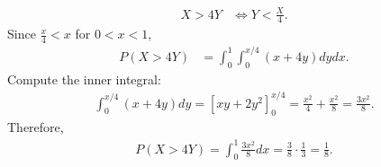 \documentclass[12pt]{article} %
\newcommand{\Red}{\color{Red}}
\begin{document}
\begin{enumerate}
        {\Red
        \begin{align*}
        X>4Y 
        &\iff Y<\frac{X}{4}.
        \end{align*}
        Since $\frac{x}{4}<x$ for $0<x<1$,
        \begin{align*}
        P(X>4Y)
        &=\int_{0}^{1}\int_{0}^{x/4}(x+4y)dydx.
        \end{align*}
        Compute the inner integral:
        \begin{align*}
        \int_{0}^{x/4}(x+4y)dy=\left[xy+2y^2\right]_{0}^{x/4} =\frac{x^2}{4}+\frac{x^2}{8} =\frac{3x^2}{8}.
        \end{align*}
        Therefore,
        \begin{align*}
        P(X>4Y)=\int_{0}^{1}\frac{3x^2}{8}dx =\frac{3}{8}\cdot\frac{1}{3} =\frac18.
        \end{align*}
        }
    
        

\end{enumerate}
\end{document}
